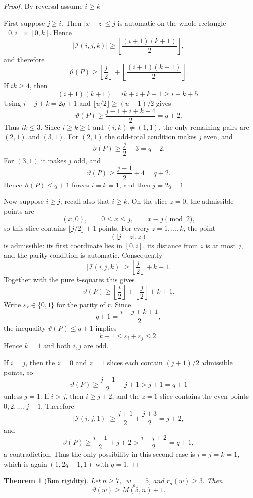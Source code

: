 \documentclass[11pt]{article}
\newtheorem{theorem}{Theorem}[section]
\theoremstyle{definition}
\newcommand{\thetaas}{\vartheta}
\newcommand{\ra}{r_a}
\begin{document}
\begin{proof}
By reversal assume $i\ge k$.

First suppose $j\ge i$. Then $|x-z|\le j$ is automatic on the whole rectangle $[0,i]\times[0,k]$. Hence
\[
 |\mathcal I(i,j,k)|\ge
 \left\lfloor\frac{(i+1)(k+1)}2\right\rfloor,
\]
and therefore
\[
 \thetaas(P)\ge
 \left\lfloor\frac j2\right\rfloor+
 \left\lfloor\frac{(i+1)(k+1)}2\right\rfloor.
\]
If $ik\ge4$, then
\[
 (i+1)(k+1)=ik+i+k+1\ge i+k+5.
\]
Using $i+j+k=2q+1$ and $\lfloor u/2\rfloor\ge(u-1)/2$ gives
\[
 \thetaas(P)\ge\frac{j-1+i+k+4}{2}=q+2.
\]
Thus $ik\le3$. Since $i\ge k\ge1$ and $(i,k)\ne(1,1)$, the only remaining pairs are $(2,1)$ and $(3,1)$. For $(2,1)$ the odd-total condition makes $j$ even, and
\[
 \thetaas(P)\ge \frac j2+3=q+2.
\]
For $(3,1)$ it makes $j$ odd, and
\[
 \thetaas(P)\ge \frac{j-1}{2}+4=q+2.
\]
Hence $\thetaas(P)\le q+1$ forces $i=k=1$, and then $j=2q-1$.

Now suppose $i\ge j$; recall also that $i\ge k$. On the slice $z=0$, the admissible points are
\[
 (x,0),\qquad 0\le x\le j,\qquad x\equiv j\pmod2,
\]
so this slice contains $\lfloor j/2\rfloor+1$ points. For every $z=1,\ldots,k$, the point
\[
 (|j-z|,z)
\]
is admissible: its first coordinate lies in $[0,i]$, its distance from $z$ is at most $j$, and the parity condition is automatic. Consequently
\[
 |\mathcal I(i,j,k)|\ge \left\lfloor\frac j2\right\rfloor+k+1.
\]
Together with the pure $b$-squares this gives
\[
 \thetaas(P)\ge
 \left\lfloor\frac i2\right\rfloor+
 \left\lfloor\frac j2\right\rfloor+k+1.
\]
Write $\varepsilon_r\in\{0,1\}$ for the parity of $r$. Since
\[
 q+1=\frac{i+j+k+1}{2},
\]
the inequality $\thetaas(P)\le q+1$ implies
\[
 k+1\le \varepsilon_i+\varepsilon_j\le2.
\]
Hence $k=1$ and both $i,j$ are odd.

If $i=j$, then the $z=0$ and $z=1$ slices each contain $(j+1)/2$ admissible points, so
\[
 \thetaas(P)\ge \frac{j-1}{2}+j+1>j+1=q+1
\]
unless $j=1$. If $i>j$, then $i\ge j+2$, and the $z=1$ slice contains the even points $0,2,\ldots,j+1$. Therefore
\[
 |\mathcal I(i,j,1)|\ge \frac{j+1}{2}+\frac{j+3}{2}=j+2,
\]
and
\[
 \thetaas(P)\ge\frac{i-1}{2}+j+2
 >\frac{i+j+2}{2}=q+1,
\]
a contradiction. Thus the only possibility in this second case is $i=j=k=1$, which is again $(1,2q-1,1)$ with $q=1$.
\end{proof}

\begin{theorem}[Run rigidity]\label{thm:run-rigidity}
Let $n\ge7$, $|w|_a=5$, and $\ra(w)\ge3$. Then
\[
 \thetaas(w)\ge M(5,n)+1.
\]
\end{theorem}
\end{document}
